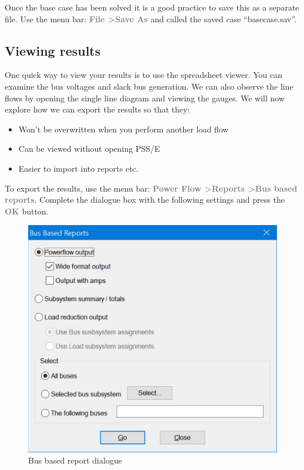\documentclass[paper=a4, fontsize=11pt]{article}
\begin{document}
Once the base case has been solved it is a good practice to save this as a separate file. Use the menu bar: \textbf{\textcolor{gray}{File \textgreater \phantom{ }Save As}} and called the saved case ``basecase.sav''.

\subsection{Viewing results}
One quick way to view your results is to use the spreadsheet viewer. You can examine the bus voltages and slack bus generation. We can also observe the line flows by opening the single line diagram and viewing the gauges. We will now explore how we can export the results so that they:
\begin{itemize}
\item{Won't be overwritten when you perform another load flow}
\item{Can be viewed without opening PSS/E}
\item{Easier to import into reports etc.}
\end{itemize}

To export the results, use the menu bar: \textbf{\textcolor{gray}{Power Flow \textgreater \phantom{ }Reports \textgreater \phantom{ }Bus based reports}}.  Complete the dialogue box with the following settings and press the  \textbf{\textcolor{gray}{OK}} button.

\begin{figure}[h]
\centering
\includegraphics[scale=0.32]{fig5_report.pdf}
\caption{Bus based report dialogue}
\label{fig:5}
\end{figure}
\end{document}
